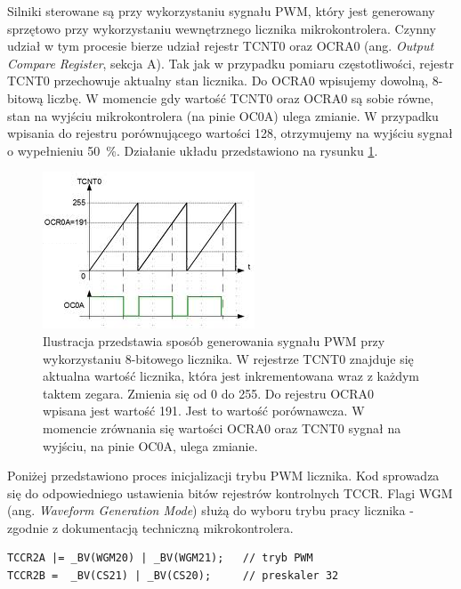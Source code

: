 Silniki sterowane są przy wykorzystaniu sygnału PWM, który jest generowany sprzętowo przy wykorzystaniu wewnętrznego licznika mikrokontrolera. Czynny udział w tym procesie bierze udział rejestr TCNT0 oraz OCRA0 (ang. \textit{Output Compare Register}, sekcja A). Tak jak w przypadku pomiaru częstotliwości, rejestr TCNT0 przechowuje aktualny stan licznika. Do OCRA0 wpisujemy dowolną, 8-bitową liczbę. W momencie gdy wartość TCNT0 oraz OCRA0 są sobie równe, stan na wyjściu mikrokontrolera (na pinie OC0A) ulega zmianie. W przypadku wpisania do rejestru porównującego wartości 128, otrzymujemy na wyjściu sygnał o wypełnieniu 50~\%. Działanie układu przedstawiono na rysunku \ref{gen_pwn}.
\newpage
\begin{figure}[H]
    \begin{center}
      \includegraphics[scale=0.9]{imgs/pwm_gen.png}
 	\caption[Realizacja sygnału PWM.]{\small{Ilustracja przedstawia sposób generowania sygnału PWM przy wykorzystaniu 8-bitowego licznika. W rejestrze TCNT0 znajduje się aktualna wartość licznika, która jest inkrementowana wraz z każdym taktem zegara. Zmienia się od 0 do 255. Do rejestru OCRA0 wpisana jest wartość 191. Jest to wartość porównawcza. W momencie zrównania się wartości OCRA0 oraz TCNT0 sygnał na wyjściu, na pinie OC0A, ulega zmianie.}\footnotemark}
	\label{gen_pwn}
    \end{center}
  \end{figure}  
\noindent
Poniżej przedstawiono proces inicjalizacji trybu PWM licznika. Kod sprowadza się do odpowiedniego ustawienia bitów rejestrów kontrolnych TCCR. Flagi WGM (ang. \textit{Waveform Generation Mode}) służą do wyboru trybu pracy licznika - zgodnie z dokumentacją techniczną mikrokontrolera\cite{nota}. 
  \begin{lstlisting}[caption=Inicjalizacja generatora PWM przy pomocy licznika Timer2]
TCCR2A |= _BV(WGM20) | _BV(WGM21);   // tryb PWM
TCCR2B =  _BV(CS21) | _BV(CS20);     // preskaler 32
\end{lstlisting}
